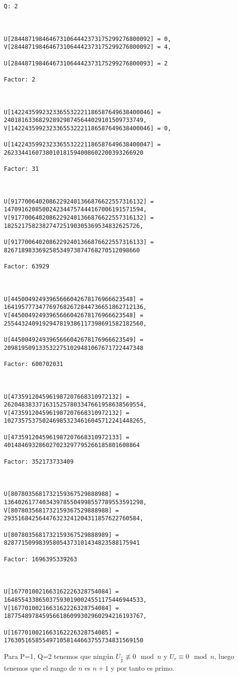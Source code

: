 \documentclass[a4paper]{article}
\begin{document}
\begin{verbatim}
Q: 2



U[2844871984646731064442373175299276800092] = 0, 
V[2844871984646731064442373175299276800092] = 4, 

U[2844871984646731064442373175299276800093] = 2

Factor: 2



U[1422435992323365532221186587649638400046] = 2401816336829289298745644029101509733749, 
V[1422435992323365532221186587649638400046] = 0, 

U[1422435992323365532221186587649638400047] = 2623344160738010181594008602200393266920

Factor: 31



U[91770064020862292401366876622557316132] = 1470916208500242344757444167006191571594, 
V[91770064020862292401366876622557316132] = 182521758238274725190305369534832625726, 

U[91770064020862292401366876622557316133] = 826718983369258534973874768270512098660

Factor: 63929



U[44500492493965666042678176966623548] = 1641957773477697682672844736651862712136, 
V[44500492493965666042678176966623548] = 2554432409192947819386117398691582182560, 

U[44500492493965666042678176966623549] = 2098195091335322751029481067671722447348

Factor: 600702031



U[4735912045961987207668310972132] = 2620483833716315257803347661958638569554, 
V[4735912045961987207668310972132] = 1027357537502469853234616045712241448265, 

U[4735912045961987207668310972133] = 401484693286027023297795266185801608864

Factor: 352173733409



U[8078035681732159367529888988] = 1364026177403439785504998557789553591298, 
V[8078035681732159367529888988] = 293516842564476323241204311857622760584, 

U[8078035681732159367529888989] = 828771509983958054373101434823588175941

Factor: 1696395339263



U[1677010021663162226328754084] = 1648554338650375930190024551175446944533, 
V[1677010021663162226328754084] = 1877548978459566186099302960294216193767, 

U[1677010021663162226328754085] = 1763051658554971058144663755734831569150
\end{verbatim}


Para P=1, Q=2 tenemos que ningún $U_{\frac{r}{p}}\not\equiv 0\mod n$ y $U_r\equiv 0\mod n$, luego tenemos que el rango de $n$ es $n+1$ y por tanto es primo.
\end{document}
